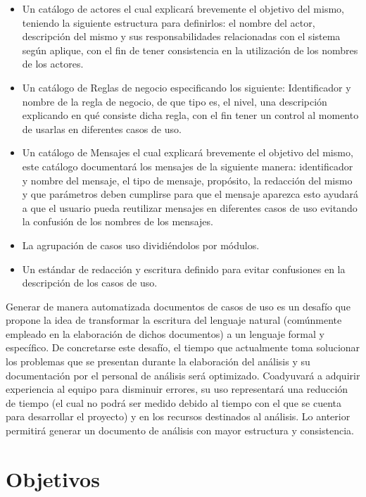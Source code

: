 \begin{itemize}
	\item Un catálogo de actores el cual explicará brevemente el objetivo del mismo, teniendo la siguiente estructura para definirlos: el nombre del actor, descripción del mismo y sus responsabilidades relacionadas con el sistema según aplique, con el fin de tener consistencia en la utilización de los nombres de los actores.
	\item Un catálogo de Reglas de negocio especificando los siguiente: Identificador y nombre de la regla de negocio, de que tipo es, el nivel, una descripción explicando en qué consiste dicha regla, con el fin tener un control al momento de usarlas en diferentes casos de uso.
	\item Un catálogo de Mensajes el cual explicará brevemente el objetivo del mismo, este catálogo documentará los mensajes de la siguiente manera: identificador y nombre del mensaje, el tipo de mensaje, propósito, la redacción del mismo y que parámetros deben cumplirse para que el mensaje aparezca esto ayudará a que el usuario pueda reutilizar mensajes en diferentes casos de uso evitando la confusión de los nombres de los mensajes.
	\item La agrupación de casos uso dividiéndolos por módulos.
	\item Un estándar de redacción y escritura definido para evitar confusiones en la descripción de los casos de uso.
\end{itemize}
	
Generar de manera automatizada documentos de casos de uso es un desafío que propone la idea de transformar la escritura del lenguaje natural (comúnmente empleado en la elaboración de dichos documentos) a un lenguaje formal y específico. De concretarse este desafío, el tiempo que actualmente toma solucionar los problemas que se presentan durante la elaboración del análisis y su documentación por el  personal de análisis será optimizado. Coadyuvará a adquirir experiencia al equipo para  disminuir errores, su uso representará una reducción de tiempo (el cual no podrá ser medido debido al tiempo con el que se cuenta para desarrollar el proyecto)  y en los recursos destinados al análisis. Lo anterior permitirá generar un documento de análisis  con mayor estructura y consistencia.
	
\section{Objetivos}
